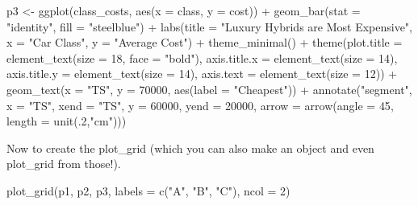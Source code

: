 \documentclass[
  letterpaper,
  DIV=11,
  numbers=noendperiod]{scrreprt}
\newenvironment{Shaded}{\begin{snugshade}}{\end{snugshade}}
\newcommand{\AttributeTok}[1]{\textcolor[rgb]{0.40,0.45,0.13}{#1}}
\newcommand{\DecValTok}[1]{\textcolor[rgb]{0.68,0.00,0.00}{#1}}
\newcommand{\FunctionTok}[1]{\textcolor[rgb]{0.28,0.35,0.67}{#1}}
\newcommand{\NormalTok}[1]{\textcolor[rgb]{0.00,0.23,0.31}{#1}}
\newcommand{\OtherTok}[1]{\textcolor[rgb]{0.00,0.23,0.31}{#1}}
\newcommand{\SpecialCharTok}[1]{\textcolor[rgb]{0.37,0.37,0.37}{#1}}
\newcommand{\StringTok}[1]{\textcolor[rgb]{0.13,0.47,0.30}{#1}}
\begin{document}
\begin{Shaded}
\begin{Highlighting}[]
\NormalTok{p3 }\OtherTok{\textless{}{-}} \FunctionTok{ggplot}\NormalTok{(class\_costs, }\FunctionTok{aes}\NormalTok{(}\AttributeTok{x =}\NormalTok{ class, }\AttributeTok{y =}\NormalTok{ cost)) }\SpecialCharTok{+}
  \FunctionTok{geom\_bar}\NormalTok{(}\AttributeTok{stat =} \StringTok{"identity"}\NormalTok{, }\AttributeTok{fill =} \StringTok{"steelblue"}\NormalTok{) }\SpecialCharTok{+}
  \FunctionTok{labs}\NormalTok{(}\AttributeTok{title =} \StringTok{"Luxury Hybrids are Most Expensive"}\NormalTok{, }\AttributeTok{x =} \StringTok{"Car Class"}\NormalTok{, }\AttributeTok{y =} \StringTok{"Average Cost"}\NormalTok{) }\SpecialCharTok{+}
  \FunctionTok{theme\_minimal}\NormalTok{() }\SpecialCharTok{+}
  \FunctionTok{theme}\NormalTok{(}\AttributeTok{plot.title =} \FunctionTok{element\_text}\NormalTok{(}\AttributeTok{size =} \DecValTok{18}\NormalTok{, }\AttributeTok{face =} \StringTok{"bold"}\NormalTok{),}
    \AttributeTok{axis.title.x =} \FunctionTok{element\_text}\NormalTok{(}\AttributeTok{size =} \DecValTok{14}\NormalTok{),}
    \AttributeTok{axis.title.y =} \FunctionTok{element\_text}\NormalTok{(}\AttributeTok{size =} \DecValTok{14}\NormalTok{),}
    \AttributeTok{axis.text =} \FunctionTok{element\_text}\NormalTok{(}\AttributeTok{size =} \DecValTok{12}\NormalTok{)) }\SpecialCharTok{+}
  \FunctionTok{geom\_text}\NormalTok{(}\AttributeTok{x =} \StringTok{"TS"}\NormalTok{, }\AttributeTok{y =} \DecValTok{70000}\NormalTok{, }\FunctionTok{aes}\NormalTok{(}\AttributeTok{label =} \StringTok{"Cheapest"}\NormalTok{)) }\SpecialCharTok{+}
  \FunctionTok{annotate}\NormalTok{(}\StringTok{"segment"}\NormalTok{, }\AttributeTok{x =} \StringTok{"TS"}\NormalTok{, }\AttributeTok{xend =} \StringTok{"TS"}\NormalTok{, }\AttributeTok{y =} \DecValTok{60000}\NormalTok{, }\AttributeTok{yend =} \DecValTok{20000}\NormalTok{, }\AttributeTok{arrow =} \FunctionTok{arrow}\NormalTok{(}\AttributeTok{angle =} \DecValTok{45}\NormalTok{, }\AttributeTok{length =} \FunctionTok{unit}\NormalTok{(.}\DecValTok{2}\NormalTok{,}\StringTok{"cm"}\NormalTok{))) }
\end{Highlighting}
\end{Shaded}

Now to create the plot\_grid (which you can also make an object and even
plot\_grid from those!).

\begin{Shaded}
\begin{Highlighting}[]
\FunctionTok{plot\_grid}\NormalTok{(p1, p2, p3, }\AttributeTok{labels =} \FunctionTok{c}\NormalTok{(}\StringTok{"A"}\NormalTok{, }\StringTok{"B"}\NormalTok{, }\StringTok{"C"}\NormalTok{), }\AttributeTok{ncol =} \DecValTok{2}\NormalTok{)}
\end{Highlighting}
\end{Shaded}
\end{document}
